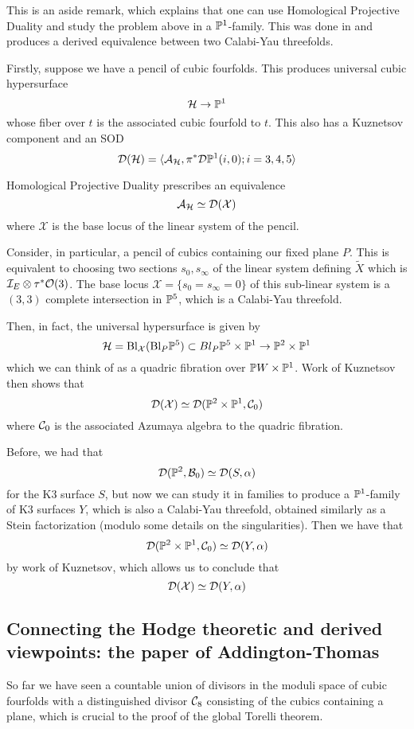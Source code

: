 This is an aside remark, which explains that one can use Homological Projective Duality and study the problem above in a $\P^1$-family. This was done in \cite{calabrese_derived_2016} and produces a derived equivalence between two Calabi-Yau threefolds.

Firstly, suppose we have a pencil of cubic fourfolds. This produces universal cubic hypersurface $$\mathcal{H}\rightarrow \P^1$$whose fiber over $t$ is the associated cubic fourfold to $t$. This also has a Kuznetsov component and an SOD $$\calD(\mathcal{H})=\langle \calA_{\mathcal{H}}, \pi^* \calD\P^1(i,0); i=3,4,5 \rangle $$

Homological Projective Duality prescribes an equivalence $$\calA_{\mathcal{H}} \simeq \calD(\mathcal{X})$$where $\mathcal{X}$ is the base locus of the linear system of the pencil.

Consider, in particular, a pencil of cubics containing our fixed plane $P$. This is equivalent to choosing two sections $s_0,s_\infty$ of the linear system defining $\tilde{X}$ which is $\calI_E\otimes \tau^* \O(3)$. The base locus $\mathcal{X}=\{s_0=s_\infty=0\}$ of this sub-linear system is a $(3,3)$ complete intersection in $\P^5$, which is a Calabi-Yau threefold.

Then, in fact, the universal hypersurface is given by $$\mathcal{H}=\mathrm{Bl}_\mathcal{X}(\mathrm{Bl}_P\P^5)\subset {Bl}_P\P^5\times \P^1 \rightarrow \P^2 \times \P^1$$
which we can think of as a quadric fibration over $\P W\times \P^1$. Work of Kuznetsov then shows that $$\calD(\mathcal{X}) \simeq \calD(\P^2 \times \P^1, \calC_0)$$ where $\calC_0$ is the associated Azumaya algebra to the quadric fibration. 

Before, we had that $$\calD(\P^2, \calB_0)\simeq \calD(S, \alpha)$$ for the K3 surface $S$, but now we can study it in families to produce a $\P^1$-family of K3 surfaces $Y$, which is also a Calabi-Yau threefold, obtained similarly as a Stein factorization (modulo some details on the singularities). Then we have that $$\calD(\P^2 \times \P^1, \calC_0)\simeq \calD(Y, \alpha)$$ by work of Kuznetsov, which allows us to conclude that $$\calD(\mathcal{X})\simeq \calD(Y,\alpha)$$


\subsection{Connecting the Hodge theoretic and derived viewpoints: the paper of Addington-Thomas}

So far we have seen a countable union of divisors in the moduli space of cubic fourfolds with a distinguished divisor $\calC_8$ consisting of the cubics containing a plane, which is crucial to the proof of the global Torelli theorem.

